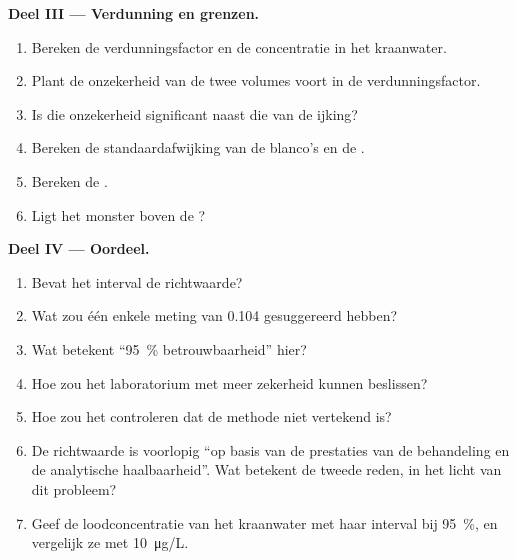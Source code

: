 \begin{problem}
\medskip
\noindent\textbf{Deel III --- Verdunning en grenzen.}
\begin{enumerate}[resume]
  \item Bereken de verdunningsfactor en de concentratie in het kraanwater.
  \item Plant de onzekerheid van de twee volumes voort in de verdunningsfactor.
  \item Is die onzekerheid significant naast die van de ijking?
  \item Bereken de standaardafwijking van de blanco's en de .
  \item Bereken de .
  \item Ligt het monster boven de ?
\end{enumerate}

\medskip
\noindent\textbf{Deel IV --- Oordeel.}
\begin{enumerate}[resume]
  \item Bevat het interval de richtwaarde?
  \item Wat zou één enkele meting van 0.104 gesuggereerd hebben?
  \item Wat betekent ``95~\% betrouwbaarheid'' hier?
  \item Hoe zou het laboratorium met meer zekerheid kunnen beslissen?
  \item Hoe zou het controleren dat de methode niet vertekend is?
  \item De richtwaarde is voorlopig ``op basis van de prestaties van de behandeling en de analytische
        haalbaarheid''. Wat betekent de tweede reden, in het licht van dit probleem?
  \item Geef de loodconcentratie van het kraanwater met haar interval bij 95~\%, en vergelijk ze met
        \qty{10}{\micro g/L}.
\end{enumerate}
\end{problem}
